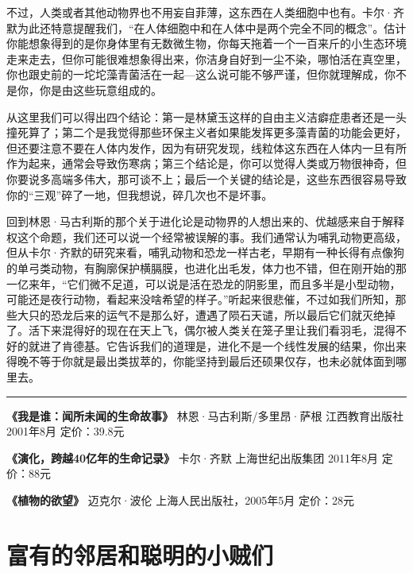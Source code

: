 不过，人类或者其他动物界也不用妄自菲薄，这东西在人类细胞中也有。卡尔·齐默为此还特意提醒我们，``在人体细胞中和在人体中是两个完全不同的概念''。估计你能想象得到的是你身体里有无数微生物，你每天拖着一个一百来斤的小生态环境走来走去，但你可能很难想象得出来，你洁身自好到一尘不染，哪怕活在真空里，你也跟史前的一坨坨藻青菌活在一起---这么说可能不够严谨，但你就理解成，你不是你，你是由这些玩意组成的。

从这里我们可以得出四个结论：第一是林黛玉这样的自由主义洁癖症患者还是一头撞死算了；第二个是我觉得那些环保主义者如果能发挥更多藻青菌的功能会更好，但还要注意不要在人体内发作，因为有研究发现，线粒体这东西在人体内一旦有所作为起来，通常会导致伤寒病；第三个结论是，你可以觉得人类或万物很神奇，但你要说多高端多伟大，那可谈不上；最后一个关键的结论是，这些东西很容易导致你的``三观''碎了一地，但我想说，碎几次也不是坏事。

回到林恩·马古利斯的那个关于进化论是动物界的人想出来的、优越感来自于解释权这个命题，我们还可以说一个经常被误解的事。我们通常认为哺乳动物更高级，但从卡尔·齐默的研究来看，哺乳动物和恐龙一样古老，早期有一种长得有点像狗的单弓类动物，有胸廓保护横膈膜，也进化出毛发，体力也不错，但在刚开始的那一亿来年，``它们微不足道，可以说是活在恐龙的阴影里，而且多半是小型动物，可能还是夜行动物，看起来没啥希望的样子。''听起来很悲催，不过如我们所知，那些大只的恐龙后来的运气不是那么好，遭遇了陨石天谴，所以最后它们就灭绝掉了。活下来混得好的现在在天上飞，偶尔被人类关在笼子里让我们看羽毛，混得不好的就进了肯德基。它告诉我们的道理是，进化不是一个线性发展的结果，你出来得晚不等于你就是最出类拔萃的，你能坚持到最后还硕果仅存，也未必就体面到哪里去。

\begin{center}\rule{0.5\linewidth}{0.5pt}\end{center}

\textbf{《我是谁：闻所未闻的生命故事》} 林恩·马古利斯/多里昂·萨根
江西教育出版社 2001年8月 定价：39.8元

\textbf{《演化，跨越40亿年的生命记录》} 卡尔·齐默 上海世纪出版集团
2011年8月 定价：88元

\textbf{《植物的欲望》} 迈克尔·波伦 上海人民出版社，2005年5月 定价：28元

\hypertarget{ux5bccux6709ux7684ux90bbux5c45ux548cux806aux660eux7684ux5c0fux8d3cux4eec}{%
\section{富有的邻居和聪明的小贼们}\label{ux5bccux6709ux7684ux90bbux5c45ux548cux806aux660eux7684ux5c0fux8d3cux4eec}}

